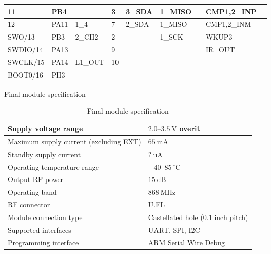 \begin{table}[H]
\begin{center}
\begin{tabular}{|l|l|l|l|l|l|l|l|l|}
    11       & PB4  &               & 3   & 3\_SDA & 1\_MISO &             & CMP1,2\_INP        \\ \hline
    12       & PA11 & 1\_4           & 7   & 2\_SDA & 1\_MISO &             & CMP1,2\_INM        \\ \hline
    SWO/13   & PB3  & 2\_CH2         & 2   &       & 1\_SCK  &             & WKUP3 \\ \hline
    SWDIO/14 & PA13 &               & 9   &       &        &             & IR\_OUT             \\ \hline
    SWCLK/15 & PA14 & L1\_OUT        & 10  &       &        &             &                    \\ \hline
    BOOT0/16 & PH3  &               &     &       &        &             &                    \\ \hline
    \end{tabular}
\end{center}
\end{table}

Final module specification

\begin{table}[H]
\begin{center}
\caption{\label{table:module-specification}Final module specification}
    \begin{tabular}{|l|l|} \hline
    Supply voltage range                    & $2.0\text{--}3.5~\mathrm{V}$ overit\\ \hline
    Maximum supply current (excluding EXT)  & $65~\mathrm{mA}$\\ \hline
    Standby supply current                  & $?~\mathrm{uA}$\\ \hline
    Operating temperature range             & $-40 \text{--} 85~\mathrm{^\circ C}$\\ \hline
    Output RF power                         & $15~\mathrm{dB}$\\ \hline
    Operating band                          & $868~\mathrm{MHz}$\\ \hline
    RF connector                            & U.FL \\ \hline
    Module connection type                  & Castellated hole (0.1 inch pitch) \\ \hline
    Supported interfaces                    & UART, SPI, I2C \\ \hline
    Programming interface                   & ARM Serial Wire Debug \\ \hline
    \end{tabular}
\end{center}
\end{table}